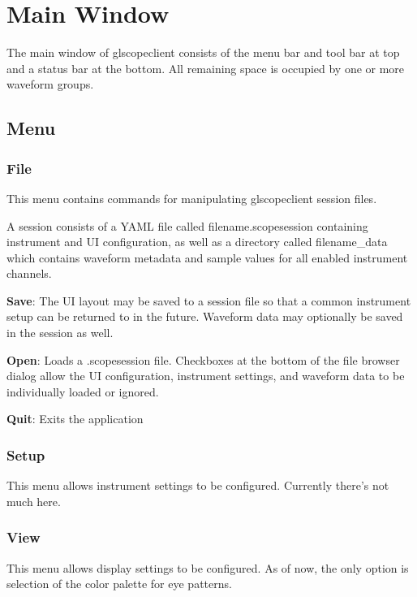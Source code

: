\section{Main Window}

The main window of glscopeclient consists of the menu bar and tool bar at top and a status bar at the bottom. All
remaining space is occupied by one or more waveform groups.

\subsection{Menu}

\subsubsection{File}

This menu contains commands for manipulating glscopeclient session files.

A session consists of a YAML file called filename.scopesession containing instrument and UI configuration, as well
as a directory called filename\_data which contains waveform metadata and sample values for all enabled instrument
channels.

\textbf{Save}: The UI layout may be saved to a session file so that a common instrument setup can be returned to in the
future. Waveform data may optionally be saved in the session as well.

\textbf{Open}: Loads a .scopesession file. Checkboxes at the bottom of the file browser dialog allow the UI
configuration, instrument settings, and waveform data to be individually loaded or ignored.

\textbf{Quit}: Exits the application

\subsubsection{Setup}

This menu allows instrument settings to be configured. Currently there's not much here.

\subsubsection{View}

This menu allows display settings to be configured. As of now, the only option is selection of the color palette for
eye patterns.

